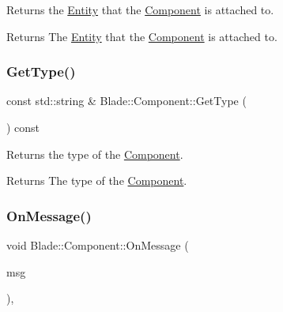 Returns the \hyperlink{class_blade_1_1_entity}{Entity} that the \hyperlink{class_blade_1_1_component}{Component} is attached to. 

\begin{DoxyReturn}{Returns}
The \hyperlink{class_blade_1_1_entity}{Entity} that the \hyperlink{class_blade_1_1_component}{Component} is attached to. 
\end{DoxyReturn}
\mbox{\label{class_blade_1_1_component_a0ad0c264894e64c7b336c12165b6beac}} 
\subsubsection{\texorpdfstring{Get\+Type()}{GetType()}}
{\footnotesize\ttfamily const std\+::string \& Blade\+::\+Component\+::\+Get\+Type (\begin{DoxyParamCaption}{ }\end{DoxyParamCaption}) const\hspace{0.3cm}{\ttfamily [noexcept]}}



Returns the type of the \hyperlink{class_blade_1_1_component}{Component}. 

\begin{DoxyReturn}{Returns}
The type of the \hyperlink{class_blade_1_1_component}{Component}. 
\end{DoxyReturn}
\mbox{\label{class_blade_1_1_component_a4b33e2a714ea0ccdf754c29969fa8f67}} 
\subsubsection{\texorpdfstring{On\+Message()}{OnMessage()}}
{\footnotesize\ttfamily void Blade\+::\+Component\+::\+On\+Message (\begin{DoxyParamCaption}\item[{const \hyperlink{class_blade_1_1_ref_counted_container}{Message\+Container}$<$ std\+::string $>$ \&}]{msg }\end{DoxyParamCaption})\hspace{0.3cm}{\ttfamily [override]}, {\ttfamily [virtual]}}




